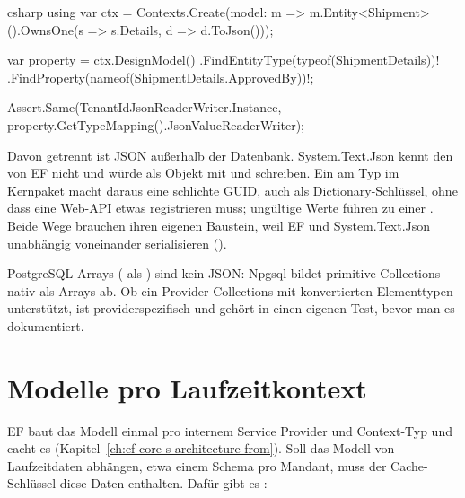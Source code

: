 \begin{sourcecode}{csharp}
using var ctx = Contexts.Create(model: m =>
    m.Entity<Shipment>().OwnsOne(s => s.Details, d => d.ToJson()));

var property = ctx.DesignModel()
    .FindEntityType(typeof(ShipmentDetails))!
    .FindProperty(nameof(ShipmentDetails.ApprovedBy))!;

Assert.Same(TenantIdJsonReaderWriter.Instance,
    property.GetTypeMapping().JsonValueReaderWriter);
\end{sourcecode}

Davon getrennt ist JSON außerhalb der Datenbank. System.Text.Json kennt den
 von EF nicht und würde
 als Objekt mit  und  schreiben. Ein
am Typ im Kernpaket macht daraus eine schlichte GUID, auch als Dictionary-Schlüssel, ohne dass
eine Web-API etwas registrieren muss; ungültige Werte führen zu einer
. Beide Wege brauchen ihren eigenen Baustein, weil EF und
System.Text.Json unabhängig voneinander serialisieren
().

\begin{note}
  PostgreSQL-Arrays ( als ) sind
  kein JSON: Npgsql bildet primitive Collections nativ als Arrays ab. Ob ein Provider
  Collections mit konvertierten Elementtypen unterstützt, ist providerspezifisch und gehört
  in einen eigenen Test, bevor man es dokumentiert.
\end{note}

\chapter{Modelle pro Laufzeitkontext}\label{ch:models-per-runtime-context}

EF baut das Modell einmal pro internem Service Provider und Context-Typ und cacht es
(Kapitel~\ref{ch:ef-core-s-architecture-from}). Soll das Modell von Laufzeitdaten abhängen,
etwa einem Schema pro Mandant, muss der Cache-Schlüssel diese Daten enthalten. Dafür gibt es
:

